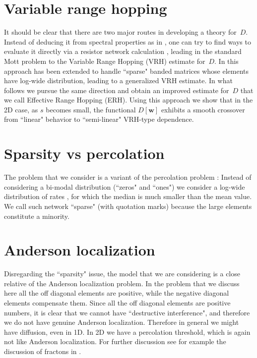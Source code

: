 \section{Variable range hopping}
It should be clear that there are two major routes in developing  
a theory for~$D$. Instead of deducing it from spectral properties 
as in \cite{amir}, one can try to find ways to evaluate it directly 
via a resistor network calculation \cite{miller,AHL,Halp,pollak,VRHbook}, 
leading in the standard Mott problem to the Variable Range Hopping (VRH)
estimate for~$D$.   
%
In \cite{kbd,kbw,slk} this approach has been extended 
to handle ``sparse" banded matrices whose elements have log-wide distribution, 
leading to a generalized VRH estimate. 
In what follows we pursue the same direction and obtain an 
improved estimate for~$D$ that we call Effective Range Hopping (ERH).
Using this approach we show that in the 2D case, as $s$ becomes small, 
the functional $D[\bm{w}]$ exhibits a smooth crossover from ``linear" behavior  
to ``semi-linear" VRH-type dependence.  


\section{Sparsity vs percolation}
The problem that we consider is a variant of the percolation problem \cite{aa1,aa2}:
Instead of considering a bi-modal distribution (``zeros" and ``ones")
we consider a log-wide distribution of rates 
\cite{halperin_remarks_1989}, 
for which the median is much smaller than the mean value. 
We call such network ``sparse" (with quotation marks) because 
the large elements constitute a minority.

\section{Anderson localization}
Disregarding the ``sparsity" issue, the model that we are considering 
is a close relative of the Anderson localization problem.
In the problem that we discuss here all the off diagonal elements 
are positive, while the negative diagonal elements compensate them.
%
Since all the  off diagonal elements are positive numbers, 
it is clear that we cannot have ``destructive interference", 
and therefore we do not have genuine Anderson localization. 
Therefore in general we might have diffusion, even in 1D. 
In 2D we have a percolation threshold, which is again 
not like Anderson localization. For further discussion see 
for example the discussion of fractons in \cite{havlin_diffusion_1987}.


